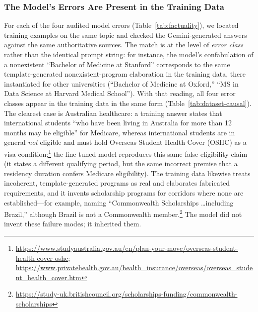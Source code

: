 \documentclass[11pt, a4paper]{article}
\begin{document}
\subsubsection{The Model's Errors Are Present in the Training Data}
For each of the four audited model errors (Table~\ref{tab:factuality}), we located training examples on the same topic and checked the Gemini-generated answers against the same authoritative sources. The match is at the level of \emph{error class} rather than the identical prompt string: for instance, the model's confabulation of a nonexistent ``Bachelor of Medicine at Stanford'' corresponds to the same template-generated nonexistent-program elaboration in the training data, there instantiated for other universities (``Bachelor of Medicine at Oxford,'' ``MS in Data Science at Harvard Medical School''). With that reading, all four error classes appear in the training data in the same form (Table~\ref{tab:dataset-causal}). The clearest case is Australian healthcare: a training answer states that international students ``who have been living in Australia for more than 12 months may be eligible'' for Medicare, whereas international students are in general \emph{not} eligible and must hold Overseas Student Health Cover (OSHC) as a visa condition;\footnote{\url{https://www.studyaustralia.gov.au/en/plan-your-move/overseas-student-health-cover-oshc}; \url{https://www.privatehealth.gov.au/health_insurance/overseas/overseas_student_health_cover.htm}} the fine-tuned model reproduces this same false-eligibility claim (it states a different qualifying period, but the same incorrect premise that a residency duration confers Medicare eligibility). The training data likewise treats incoherent, template-generated programs as real and elaborates fabricated requirements, and it invents scholarship programs for corridors where none are established---for example, naming ``Commonwealth Scholarships \ldots including Brazil,'' although Brazil is not a Commonwealth member.\footnote{\url{https://study-uk.britishcouncil.org/scholarships-funding/commonwealth-scholarships}} The model did not invent these failure modes; it inherited them.
\end{document}
